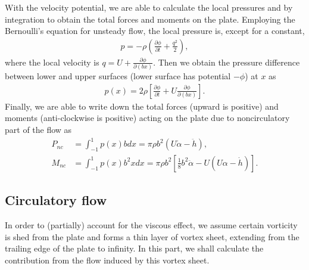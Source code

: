 With the velocity potential, we are able to calculate the local pressures and by integration to obtain the total forces and moments on the plate.
Employing the Bernoulli's equation for unsteady flow, the local pressure is, except for a constant,
\begin{align}
p = -\rho (\frac{\partial \phi}{\partial t} + \frac{q^2}{2}),
\end{align} 
where the local velocity is $q = U + \frac{\partial \phi}{\partial (bx)}$.
Then we obtain the pressure difference between lower and upper surfaces (lower surface has potential $-\phi$) at $x$ as
\begin{align}
p(x) = 2 \rho [\frac{\partial \phi}{\partial t} + U\frac{\partial \phi}{\partial (bx)}].
\end{align} 
Finally, we are able to write down the total forces (upward is positive) and moments (anti-clockwise is positive) acting on the plate due to noncirculatory part of the flow as
\begin{align}
P_{nc} & = \int^{1}_{-1} p(x)bdx
   = \pi\rho b^2(U\dot{\alpha} - \ddot{h}),   \\
M_{nc} & = \int^{1}_{-1} p(x)b^2xdx
   = \pi\rho b^2[\frac{1}{8}b^2\ddot{\alpha} - U(U\alpha - \dot{h})].
\end{align}


\subsection{Circulatory flow}

In order to (partially) account for the viscous effect, we assume certain vorticity is shed from the plate and forms a thin layer of vortex sheet, extending from the trailing edge of the plate to infinity.
In this part, we shall calculate the contribution from the flow induced by this vortex sheet.

